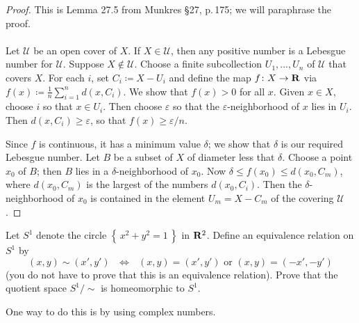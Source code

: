 \begin{proof}
This is Lemma 27.5 from Munkres \S27, p.\,175; we will paraphrase the
proof.
\\\\
Let $\mathcal{U}$ be an open cover of $X$. If $X\in\mathcal{U}$, then any
positive number is a Lebesgue number for $\mathcal{U}$. Suppose
$X\notin\mathcal{U}$. Choose a finite subcollection $U_1,...,U_n$ of
$\mathcal{U}$ that covers $X$. For each $i$, set $C_i\coloneqq X-U_i$ and
define the map $f\colon X\to\mathbf{R}$ via
$f(x)\coloneqq\frac{1}{n}\sum_{i=1}^nd(x,C_i)$. We show that $f(x)>0$ for all
$x$. Given $x\in X$, choose $i$ so that $x\in U_i$. Then choose
$\varepsilon$ so that the $\varepsilon$-neighborhood of $x$ lies in
$U_i$. Then $d(x,C_i)\geq\varepsilon$, so that $f(x)\geq\varepsilon/n$.

Since $f$ is continuous, it has a minimum value $\delta$; we show that
$\delta$ is our required Lebesgue number. Let $B$ be a subset of $X$ of
diameter less that $\delta$. Choose a point $x_0$ of $B$; then $B$ lies in
a $\delta$-neighborhood of $x_0$. Now $\delta\leq f(x_0)\leq d(x_0,C_m)$,
where $d(x_0,C_m)$ is the largest of the numbers $d(x_0,C_i)$. Then the
$\delta$-neighborhood of $x_0$ is contained in the element $U_m=X-C_m$ of
the covering $\mathcal{U}$.
\end{proof}
\begin{problem}
Let $S^1$ denote the circle $\left\{\,x^2+y^2=1\,\right\}$ in
$\mathbf{R}^2$. Define an equivalence relation on $S^1$ by
\[\text{$(x,y)\sim (x',y')$ $\iff$ $(x,y)=(x',y')$ or $(x,y)=(-x',-y')$}\]
(you do not have to prove that this is an equivalence
relation). Prove that the quotient space $S^1/{\sim}$ is
homeomorphic to $S^1$.

One way to do this is by using complex numbers.
\end{problem}
